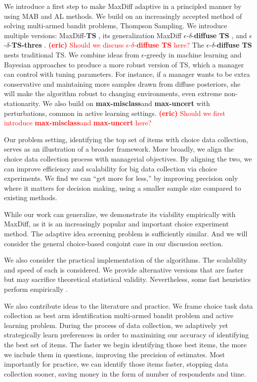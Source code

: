 \documentclass[nonblindrev]{informs3}
\newcommand{\eric}[1]{\textcolor{red}{\textbf{(eric)} #1}}
\newcommand{\mismin}{\textbf{max-misclass}}
\newcommand{\ts}{\textbf{TS} }
\newcommand{\edts}{$\epsilon$-$\delta$-\textbf{diffuse TS} }
\newcommand{\edtsthres}{$\epsilon$-$\delta$-\textbf{TS-thres} }
\newcommand{\uncert}{\textbf{max-uncert} }
\begin{document}
We introduce a first step to make MaxDiff adaptive in a principled manner by using MAB and AL methods. We build on an increasingly accepted method of solving multi-armed bandit problems, Thompson Sampling. We introduce multiple versions: MaxDiff-\ts, its generalization MaxDiff \edts, and \edtsthres. \eric{Should we discuss \edts here?} The \edts nests traditional TS. We combine ideas from $\epsilon$-greedy in machine learning and Bayesian approaches to produce a more robust version of TS,  which a manager can control with tuning parameters. For instance, if a manager wants to be extra conservative and maintaining more samples drawn from diffuse posteriors, she will make the algorithm robust to changing environments, even extreme non-stationarity. We also build on \mismin and \uncert with perturbations, common in active learning settings. \eric{Should we first introduce \mismin and \uncert here?}


Our problem setting, identifying the top set of items with choice data collection, serves as an illustration of a broader framework. More broadly, we align the choice data collection process with managerial objectives. By aligning the two, we can improve efficiency and scalability for big data collection via choice experiments. We find we can ``get more for less,'' by improving precision only where it matters for decision making, using a smaller sample size compared to existing methods.

While our work can generalize, we demonstrate its viability empirically with MaxDiff, as it is an increasingly popular and important choice experiment method. The adaptive idea screening problem is sufficiently similar. And we will consider the general choice-based conjoint case in our discussion section. 

We also consider the practical implementation of the algorithms. The scalability and speed of each is considered. We provide alternative versions that are faster but may sacrifice theoretical statistical validity. Nevertheless, some fast heuristics perform empirically . 

We also contribute ideas to the literature and practice. We frame choice task data collection as best arm identification multi-armed bandit problem and active learning problem. During the process of data collection, we adaptively yet strategically learn preferences in order to maximizing our accuracy of identifying the best set of items. The faster we begin identifying those best items, the more we include them in questions, improving the precision of estimates. Most importantly for practice, we can identify those items faster, stopping data collection sooner, saving money in the form of number of respondents and time. 
\end{document}
